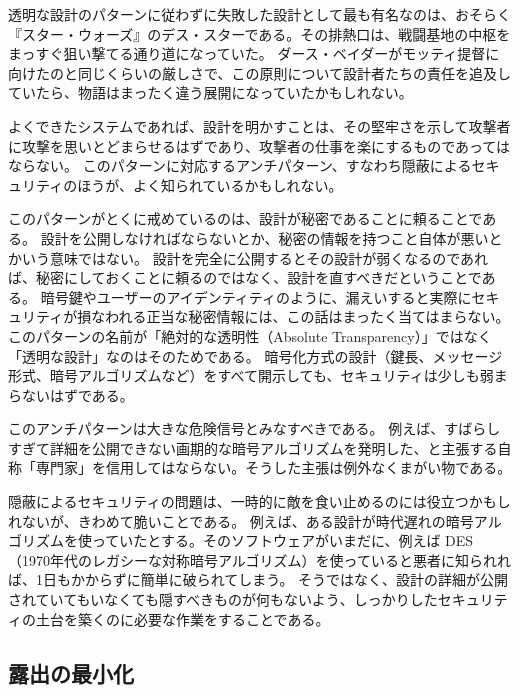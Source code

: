 \documentclass[uplatex]{jsarticle}
\def\label#1{}%
\begin{document}
\begin{exa}[デス・スター]\label{exa:ch4-death-star}
透明な設計のパターンに従わずに失敗した設計として最も有名なのは、おそらく『スター・ウォーズ』のデス・スターである。その排熱口は、戦闘基地の中枢をまっすぐ狙い撃てる通り道になっていた。
ダース・ベイダーがモッティ提督に向けたのと同じくらいの厳しさで、この原則について設計者たちの責任を追及していたら、物語はまったく違う展開になっていたかもしれない。
\end{exa}

よくできたシステムであれば、設計を明かすことは、その堅牢さを示して攻撃者に攻撃を思いとどまらせるはずであり、攻撃者の仕事を楽にするものであってはならない。
このパターンに対応するアンチパターン、すなわち隠蔽によるセキュリティのほうが、よく知られているかもしれない。

このパターンがとくに戒めているのは、設計が秘密であることに頼ることである。
設計を公開しなければならないとか、秘密の情報を持つこと自体が悪いとかいう意味ではない。
設計を完全に公開するとその設計が弱くなるのであれば、秘密にしておくことに頼るのではなく、設計を直すべきだということである。
暗号鍵やユーザーのアイデンティティのように、漏えいすると実際にセキュリティが損なわれる正当な秘密情報には、この話はまったく当てはまらない。
このパターンの名前が「絶対的な透明性（Absolute Transparency）」ではなく「透明な設計」なのはそのためである。
暗号化方式の設計（鍵長、メッセージ形式、暗号アルゴリズムなど）をすべて開示しても、セキュリティは少しも弱まらないはずである。

\begin{rem}[隠蔽によるセキュリティは危険信号である]\label{rem:ch4-obscurity-red-flag}
このアンチパターンは大きな危険信号とみなすべきである。
例えば、すばらしすぎて詳細を公開できない画期的な暗号アルゴリズムを発明した、と主張する自称「専門家」を信用してはならない。そうした主張は例外なくまがい物である。
\end{rem}

隠蔽によるセキュリティの問題は、一時的に敵を食い止めるのには役立つかもしれないが、きわめて脆いことである。
例えば、ある設計が時代遅れの暗号アルゴリズムを使っていたとする。そのソフトウェアがいまだに、例えば DES（1970年代のレガシーな対称暗号アルゴリズム）を使っていると悪者に知られれば、1日もかからずに簡単に破られてしまう。
そうではなく、設計の詳細が公開されていてもいなくても隠すべきものが何もないよう、しっかりしたセキュリティの土台を築くのに必要な作業をすることである。

\subsection{露出の最小化}
\end{document}
